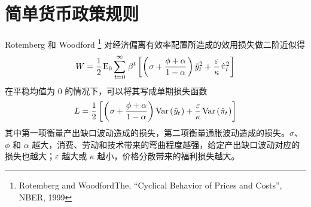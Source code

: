 \section{简单货币政策规则}

Rotemberg 和 Woodford \footnote{Rotemberg and WoodfordThe, ``Cyclical Behavior of Prices and Costs'', NBER, 1999} 对经济偏离有效率配置所造成的效用损失做二阶近似得
\begin{align*}
    W=\dfrac12\,\meano\sum^\infty_{t=0}\,\beta^t\bks{\bka{\sigma+\dfrac{\phi+\alpha}{1-\alpha}}\tilde y^2_t+\dfrac\varepsilon\kappa\,\hat\pi_t^2}
\end{align*}
在平稳均值为 0 的情况下，可以将其写成单期损失函数
\begin{align*}
    L=\dfrac12\bks{\bka{\sigma+\dfrac{\phi+\alpha}{1-\alpha}}\var\bka{\tilde y_t}+\dfrac\varepsilon\kappa\,\var\bka{\hat\pi_t}}
\end{align*}
其中第一项衡量产出缺口波动造成的损失，第二项衡量通胀波动造成的损失。\(\sigma\)、\(\phi\) 和 \(\alpha\) 越大，消费、劳动和技术带来的弯曲程度越强，给定产出缺口波动对应的损失也越大；\(\varepsilon\) 越大或 \(\kappa\) 越小，价格分散带来的福利损失越大。

